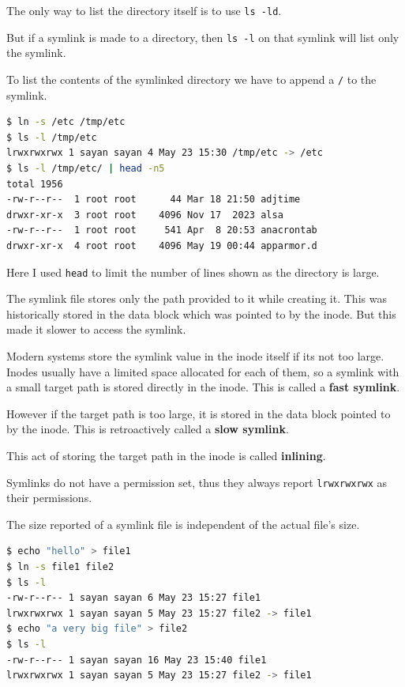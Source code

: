 The only way to list the directory itself is to use \texttt{ls -ld}.

But if a symlink is made to a directory, then \texttt{ls -l} on that symlink will list only the symlink.

To list the contents of the symlinked directory we have to append a \texttt{/} to the symlink.

\begin{lstlisting}[language=bash]
$ ln -s /etc /tmp/etc
$ ls -l /tmp/etc
lrwxrwxrwx 1 sayan sayan 4 May 23 15:30 /tmp/etc -> /etc
$ ls -l /tmp/etc/ | head -n5
total 1956
-rw-r--r--  1 root root      44 Mar 18 21:50 adjtime
drwxr-xr-x  3 root root    4096 Nov 17  2023 alsa
-rw-r--r--  1 root root     541 Apr  8 20:53 anacrontab
drwxr-xr-x  4 root root    4096 May 19 00:44 apparmor.d
\end{lstlisting}

Here I used \texttt{head} to limit the number of lines shown as the directory is large.

The symlink file stores only the path provided to it while creating it.
This was historically stored in the data block which was pointed to by the inode.
But this made it slower to access the symlink.

Modern systems store the symlink value in the inode itself if its not too large.
Inodes usually have a limited space allocated for each of them, so a symlink with a small target path is stored directly in the inode.
This is called a \textbf{fast symlink}.

However if the target path is too large, it is stored in the data block pointed to by the inode.
This is retroactively called a \textbf{slow symlink}.

This act of storing the target path in the inode is called \textbf{inlining}.

Symlinks do not have a permission set, thus they always report \texttt{lrwxrwxrwx} as their permissions.

The size reported of a symlink file is independent of the actual file's size.

\begin{lstlisting}[language=bash]
$ echo "hello" > file1
$ ln -s file1 file2
$ ls -l
-rw-r--r-- 1 sayan sayan 6 May 23 15:27 file1
lrwxrwxrwx 1 sayan sayan 5 May 23 15:27 file2 -> file1
$ echo "a very big file" > file2
$ ls -l
-rw-r--r-- 1 sayan sayan 16 May 23 15:40 file1
lrwxrwxrwx 1 sayan sayan 5 May 23 15:27 file2 -> file1
\end{lstlisting}

